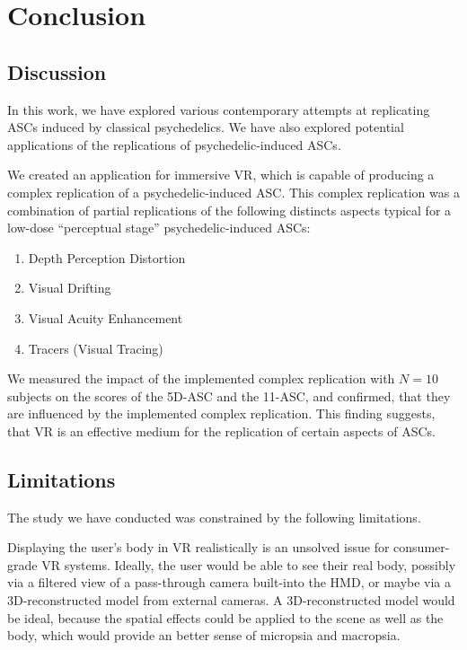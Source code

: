 \chapter{Conclusion}
\section{Discussion}
In this work, we have explored various contemporary attempts at replicating \acfp{ASC} induced by classical psychedelics. We have also explored potential applications of the replications of psychedelic-induced \acp{ASC}.

We created an application for immersive \acf{VR}, which is capable of producing a complex replication of a psychedelic-induced \ac{ASC}. This complex replication was a combination of partial replications of the following distincts aspects typical for a low-dose ``perceptual stage'' psychedelic-induced \acp{ASC}:

\begin{enumerate}
    \setlength{\itemsep}{0pt}
    \setlength{\parskip}{0pt}
    \item Depth Perception Distortion
    \item Visual Drifting
    \item Visual Acuity Enhancement
    \item Tracers (Visual Tracing)
\end{enumerate}

We measured the impact of the implemented complex replication with $N=10$ subjects on the scores of the \acf{5D-ASC} and the \acf{11-ASC}, and confirmed, that they are influenced by the implemented complex replication. This finding suggests, that \ac{VR} is an effective medium for the replication of certain aspects of \acp{ASC}.

\section{Limitations}
The study we have conducted was constrained by the following limitations.

Displaying the user's body in \ac{VR} realistically is an unsolved issue for consumer-grade \ac{VR} systems. Ideally, the user would be able to see their real body, possibly via a filtered view of a pass-through camera built-into the \acf{HMD}, or maybe via a 3D-reconstructed model from external cameras. A 3D-reconstructed model would be ideal, because the spatial effects could be applied to the scene as well as the body, which would provide an better sense of micropsia and macropsia.

